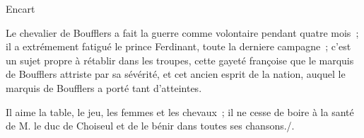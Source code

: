 \begin{diary}{Encart}{}
        
                              Le chevalier de
                                 Boufflers a fait la
                              guerre comme volontaire pendant quatre
                              mois ; il a extrémement fatigué le
                                 prince Ferdinant, toute la derniere
                              campagne ; c'est un sujet propre à
                              rétablir dans les troupes, cette gayeté
                              françoise que le marquis de Boufflers
                              attriste par sa sévérité, et cet ancien
                              esprit de la nation, auquel le
                                 marquis
                                 de Boufflers a porté tant d'atteintes. \bigskip
        
         Il aime la table, le jeu, les femmes et les
                              chevaux ; il ne cesse de boire à la santé
                              de M. le duc de Choiseul et
                              de le bénir
                              dans toutes ses chansons./. 
                           \bigskip
        
        \end{diary}
                     
                     

